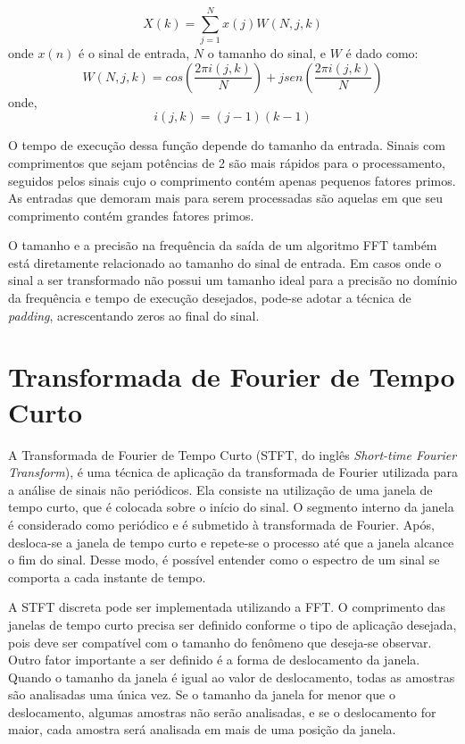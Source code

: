 \begin{equation} \label{eq-fft-matlab}
	X(k)=\sum_{j=1}^{N}x(j) W(N,j,k)
\end{equation}
onde $x(n)$ é o sinal de entrada, $N$ o tamanho do sinal, e $W$ é dado como:
\begin{equation} \label{eq-fft-matlab-w}
	W(N,j,k) = cos(\frac{2\pi i(j,k)}{N}) + j sen(\frac{2\pi i(j,k)}{N})
\end{equation}
onde,
\begin{equation} \label{eq-fft-matlab-i}
	i(j,k) = (j-1)(k-1)
\end{equation}

O tempo de execução dessa função depende do tamanho da entrada. Sinais com comprimentos que sejam potências de 2 são mais rápidos para o processamento, seguidos pelos sinais cujo o comprimento contém apenas pequenos fatores primos. As entradas que demoram mais para serem processadas são aquelas em que seu comprimento contém grandes fatores primos.


O tamanho e a precisão na frequência da saída de um algoritmo FFT também está diretamente relacionado ao tamanho do sinal de entrada. Em casos onde o sinal a ser transformado não possui um tamanho ideal para a precisão no domínio da frequência e tempo de execução desejados, pode-se adotar a técnica de \textit{padding}, acrescentando zeros ao final do sinal. 


\section{Transformada de Fourier de Tempo Curto}

A Transformada de Fourier de Tempo Curto (STFT, do inglês \textit{Short-time Fourier Transform}), é uma técnica de aplicação da transformada de Fourier utilizada para a análise de sinais não periódicos. Ela consiste na utilização de uma janela de tempo curto, que é colocada sobre o início do sinal. O segmento interno da janela é considerado como periódico e é submetido à transformada de Fourier. Após, desloca-se a janela de tempo curto e repete-se o processo até que a janela alcance o fim do sinal. Desse modo, é possível entender como o espectro de um sinal se comporta a cada instante de tempo. 


A STFT discreta pode ser implementada utilizando a FFT. O comprimento das janelas de tempo curto precisa ser definido conforme o tipo de aplicação desejada, pois deve ser compatível com o tamanho do fenômeno que deseja-se observar. Outro fator importante a ser definido é a forma de deslocamento da janela. Quando o tamanho da janela é igual ao valor de deslocamento, todas as amostras são analisadas uma única vez. Se o tamanho da janela for menor que o deslocamento, algumas amostras não serão analisadas, e se o deslocamento for maior, cada amostra será analisada em mais de uma posição da janela.


